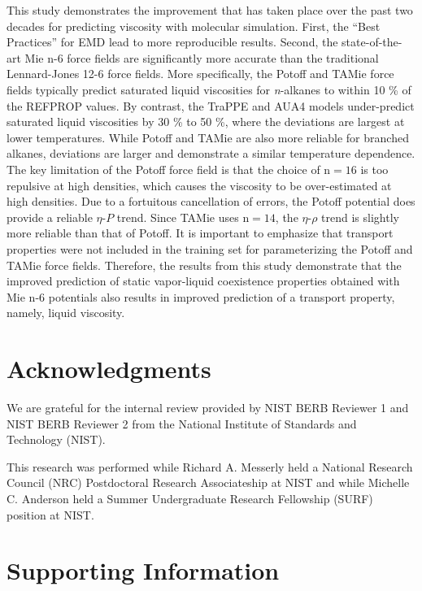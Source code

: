 \documentclass[preprint,review,12pt]{elsarticle}
\begin{document}
	This study demonstrates the improvement that has taken place over the past two decades for predicting viscosity with molecular simulation. First, the ``Best Practices'' for EMD lead to more reproducible results. Second, the state-of-the-art Mie n-6 force fields are significantly more accurate than the traditional Lennard-Jones 12-6 force fields. More specifically, the Potoff and TAMie force fields typically predict saturated liquid viscosities for \textit{n}-alkanes to within 10 \% of the REFPROP values. By contrast, the TraPPE and AUA4 models under-predict saturated liquid viscosities by 30 \% to 50 \%, where the deviations are largest at lower temperatures. While Potoff and TAMie are also more reliable for branched alkanes, deviations are larger and demonstrate a similar temperature dependence. The key limitation of the Potoff force field is that the choice of n$=16$ is too repulsive at high densities, which causes the viscosity to be over-estimated at high densities. Due to a fortuitous cancellation of errors, the Potoff potential does provide a reliable $\eta$-$P$ trend. Since TAMie uses n$=14$, the $\eta$-$\rho$ trend is slightly more reliable than that of Potoff. It is important to emphasize that transport properties were not included in the training set for parameterizing the Potoff and TAMie force fields. Therefore, the results from this study demonstrate that the improved prediction of static vapor-liquid coexistence properties obtained with Mie n-6 potentials also results in improved prediction of a transport property, namely, liquid viscosity.
	
	\section*{Acknowledgments}
	
	We are grateful for the internal review provided by NIST BERB Reviewer 1 and NIST BERB Reviewer 2 from the National Institute of Standards and Technology (NIST). 
	
	This research was performed while Richard A. Messerly held a National Research Council (NRC) Postdoctoral Research Associateship at NIST and while Michelle C. Anderson held a Summer Undergraduate Research Fellowship (SURF) position at NIST.
	
	
	
	
	\section{Supporting Information}
	
\end{document}
